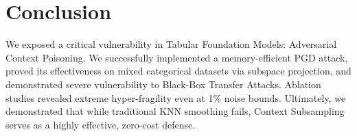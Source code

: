 \section{Conclusion}
We exposed a critical vulnerability in Tabular Foundation Models: Adversarial Context Poisoning. We successfully implemented a memory-efficient PGD attack, proved its effectiveness on mixed categorical datasets via subspace projection, and demonstrated severe vulnerability to Black-Box Transfer Attacks. Ablation studies revealed extreme hyper-fragility even at 1\% noise bounds. Ultimately, we demonstrated that while traditional KNN smoothing fails, Context Subsampling serves as a highly effective, zero-cost defense.
